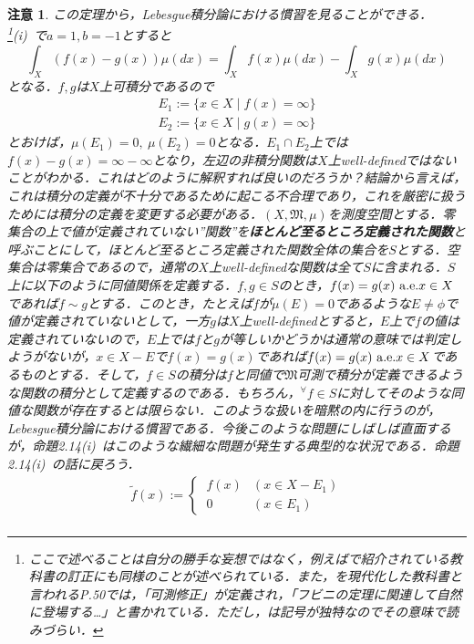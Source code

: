 \documentclass[a4paper,11pt]{jsarticle}
\newtheorem{attention}{注意}
\begin{document}
\begin{attention}
この定理から，Lebesgue積分論における慣習を見ることができる．\footnote{ここで述べることは自分の勝手な妄想ではなく，例えば\cite{ubutun1}で紹介されている教科書の訂正にも同様のことが述べられている．また，\cite{ito}を現代化した教科書と言われる\cite{yoshida}P.50では，「可測修正」が定義され，「フビニの定理に関連して自然に登場する…」と書かれている．ただし，\cite{yoshida}は記号が独特なのでその意味で読みづらい．}(i){\ }で$a=1,b=-1$とすると
\begin{equation*}
\int_X(f(x)-g(x))\mu(dx)=\int_Xf(x)\mu(dx)-\int_Xg(x)\mu(dx)
\end{equation*}
となる．$f,g$は$X$上可積分であるので
\begin{eqnarray*}
E_1:=\{x\in X \mid f(x)=\infty\} \\
E_2:=\{x\in X \mid g(x)=\infty\}
\end{eqnarray*}
とおけば，$\mu(E_1)=0,{\ }\mu(E_2)=0$となる．$E_1\cap E_2$上では$f(x)-g(x)=\infty-\infty$となり，左辺の非積分関数は$X$上well-definedではないことがわかる．これはどのように解釈すれば良いのだろうか？結論から言えば，これは積分の定義が不十分であるために起こる不合理であり，これを厳密に扱うためには積分の定義を変更する必要がある．$(X,\mathfrak{M},\mu)$を測度空間とする．零集合の上で値が定義されていない''関数''を{\bf ほとんど至るところ定義された関数}と呼ぶことにして，ほとんど至るところ定義された関数全体の集合を$S$とする．空集合は零集合であるので，通常の$X$上well-definedな関数は全て$S$に含まれる．$S$上に以下のように同値関係を定義する．$f,g\in S$のとき，$f(x)=g(x){\ }{\rm a.e.}x\in X$であれば$f\sim g$とする．このとき，たとえば$f$が$\mu(E)=0$であるような$E\neq\phi$で値が定義されていないとして，一方$g$は$X$上well-definedとすると，$E$上で$f$の値は定義されていないので，$E$上では$f$と$g$が等しいかどうかは通常の意味では判定しようがないが，$x\in X-E$で$f(x)=g(x)$であれば$f(x)=g(x){\ }{\rm a.e.}x\in X$であるものとする．そして，$f\in S$の積分は$f$と同値で$\mathfrak{M}$可測で積分が定義できるような関数の積分として定義するのである．もちろん，$^\forall f\in S$に対してそのような同値な関数が存在するとは限らない．このような扱いを暗黙の内に行うのが，Lebesgue積分論における慣習である．今後このような問題にしばしば直面するが，命題2.14(i){\ }はこのような繊細な問題が発生する典型的な状況である．命題2.14(i){\ }の話に戻ろう．
\begin{eqnarray*}
\widetilde{f}(x):=\begin{cases}
\displaystyle
{\ }f(x) & (x\in X-E_1) \\
{\ }0 & (x\in E_1)
\end{cases} \\

\end{eqnarray*}
\end{attention}
\end{document}
